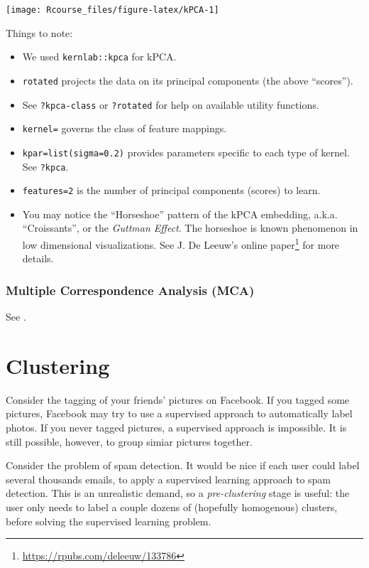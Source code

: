 \documentclass[]{book}
\providecommand{\tightlist}{%
  \setlength{\itemsep}{0pt}\setlength{\parskip}{0pt}}
\renewcommand{\href}[2]{#2\footnote{\url{#1}}}
\theoremstyle{definition}
\theoremstyle{definition}
\theoremstyle{definition}
\theoremstyle{remark}
\let\BeginKnitrBlock\begin \let\EndKnitrBlock\end
\begin{document}
\texttt{[image: Rcourse\_files/figure-latex/kPCA-1]}

Things to note:

\begin{itemize}
\tightlist
\item
  We used \texttt{kernlab::kpca} for kPCA.
\item
  \texttt{rotated} projects the data on its principal components (the above ``scores'').
\item
  See \texttt{?\textquotesingle{}kpca-class\textquotesingle{}} or \texttt{?rotated} for help on available utility functions.
\item
  \texttt{kernel=} governs the class of feature mappings.
\item
  \texttt{kpar=list(sigma=0.2)} provides parameters specific to each type of kernel. See \texttt{?kpca}.
\item
  \texttt{features=2} is the number of principal components (scores) to learn.
\item
  You may notice the ``Horseshoe'' pattern of the kPCA embedding, a.k.a. ``Croissants'', or the \emph{Guttman Effect}. The horseshoe is known phenomenon in low dimensional visualizations. See \href{https://rpubs.com/deleeuw/133786}{J. De Leeuw's online paper} for more details.
\end{itemize}

\hypertarget{multiple-correspondence-analysis-mca}{%
\subsubsection{Multiple Correspondence Analysis (MCA)}\label{multiple-correspondence-analysis-mca}}

See \citet{izenman2008modern}.

\pagebreak

\hypertarget{cluster}{%
\section{Clustering}\label{cluster}}

\BeginKnitrBlock{example}
\protect\hypertarget{exm:photos}{}{\label{exm:photos} }Consider the tagging of your friends' pictures on Facebook.
If you tagged some pictures, Facebook may try to use a supervised approach to automatically label photos.
If you never tagged pictures, a supervised approach is impossible.
It is still possible, however, to group simiar pictures together.
\EndKnitrBlock{example}

\BeginKnitrBlock{example}
\protect\hypertarget{exm:spam}{}{\label{exm:spam} }Consider the problem of spam detection.
It would be nice if each user could label several thousands emails, to apply a supervised learning approach to spam detection.
This is an unrealistic demand, so a \emph{pre-clustering} stage is useful: the user only needs to label a couple dozens of (hopefully homogenous) clusters, before solving the supervised learning problem.
\EndKnitrBlock{example}
\end{document}
